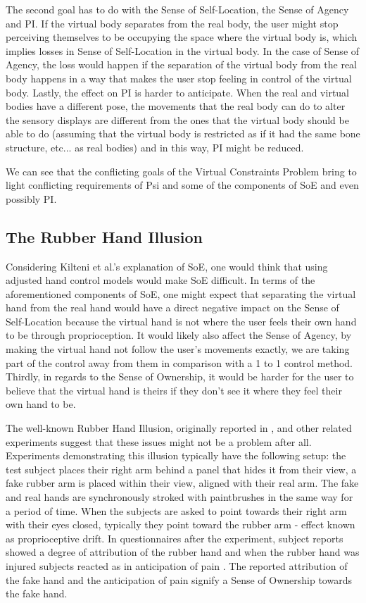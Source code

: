 The second goal has to do with the Sense of Self-Location,  the Sense of Agency and PI. If the virtual body separates from the real body, the user might stop perceiving themselves to be occupying the space where the virtual body is, which implies losses in Sense of Self-Location in the virtual body. In the case of Sense of Agency, the loss would happen if the separation of the virtual body from the real body happens in a way that makes the user stop feeling in control of the virtual body. Lastly, the effect on PI is harder to anticipate. When the real and virtual bodies have a different pose, the movements that the real body can do to alter the sensory displays are different from the ones that the virtual body should be able to do (assuming that the virtual body is restricted as if it had the same bone structure, etc... as real bodies) and in this way, PI might be reduced.

We can see that the conflicting goals of the Virtual Constraints Problem bring to light conflicting requirements of Psi and some of the components of SoE and even possibly PI.

\subsection{The Rubber Hand Illusion}
\label{subsec:rubberHandIllusion}

Considering Kilteni et al.'s explanation of SoE, one would think that using adjusted hand control models would make SoE difficult. In terms of the aforementioned components of SoE, one might expect that separating the virtual hand from the real hand would have a direct negative impact on the Sense of Self-Location because the virtual hand is not where the user feels their own hand to be through proprioception. It would likely also affect the Sense of Agency, by making the virtual hand not follow the user's movements exactly, we are taking part of the control away from them in comparison with a 1 to 1 control method. Thirdly, in regards to the Sense of Ownership, it would be harder for the user to believe that the virtual hand is theirs if they don't see it where they feel their own hand to be.

The well-known Rubber Hand Illusion, originally reported in \parencite{Botvinick1998}, and other related experiments suggest that these issues might not be a problem after all. Experiments demonstrating this illusion typically have the following setup: the test subject places their right arm behind a panel that hides it from their view, a fake rubber arm is placed within their view, aligned with their real arm. The fake and real hands are synchronously stroked with paintbrushes in the same way for a period of time. When the subjects are asked to point towards their right arm with their eyes closed, typically they point toward the rubber arm - effect known as proprioceptive drift. In questionnaires after the experiment, subject reports showed a degree of attribution of the rubber hand \parencite{Botvinick1998} and when the rubber hand was injured subjects reacted as in anticipation of pain \parencite{Armel2003}. The reported attribution of the fake hand and the anticipation of pain signify a Sense of Ownership towards the fake hand.

